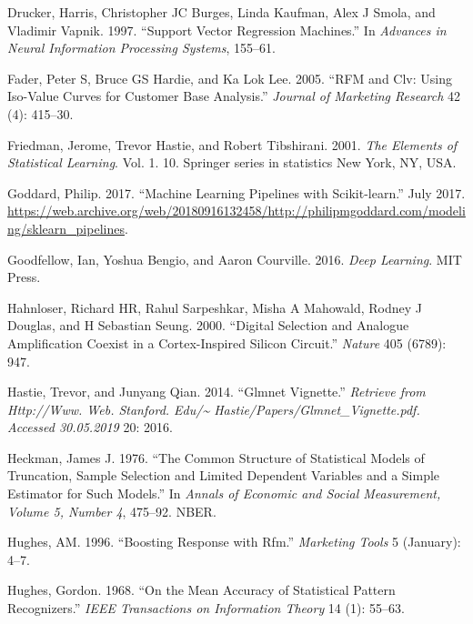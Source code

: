 \documentclass[
  11pt,
  a4paper,
  DIV=12,captions=tableheading,oneside,titlepage]{scrbook}
\begin{document}
\leavevmode\hypertarget{ref-drucker1997support}{}%
Drucker, Harris, Christopher JC Burges, Linda Kaufman, Alex J Smola, and Vladimir Vapnik. 1997. ``Support Vector Regression Machines.'' In \emph{Advances in Neural Information Processing Systems}, 155--61.

\leavevmode\hypertarget{ref-fader2005rfmclv}{}%
Fader, Peter S, Bruce GS Hardie, and Ka Lok Lee. 2005. ``RFM and Clv: Using Iso-Value Curves for Customer Base Analysis.'' \emph{Journal of Marketing Research} 42 (4): 415--30.

\leavevmode\hypertarget{ref-friedman2001elements}{}%
Friedman, Jerome, Trevor Hastie, and Robert Tibshirani. 2001. \emph{The Elements of Statistical Learning}. Vol. 1. 10. Springer series in statistics New York, NY, USA.

\leavevmode\hypertarget{ref-goddard2017variance}{}%
Goddard, Philip. 2017. ``Machine Learning Pipelines with Scikit-learn.'' July 2017. \url{https://web.archive.org/web/20180916132458/http://philipmgoddard.com/modeling/sklearn_pipelines}.

\leavevmode\hypertarget{ref-goodfellow2016deep}{}%
Goodfellow, Ian, Yoshua Bengio, and Aaron Courville. 2016. \emph{Deep Learning}. MIT Press.

\leavevmode\hypertarget{ref-hahnloser2000digital}{}%
Hahnloser, Richard HR, Rahul Sarpeshkar, Misha A Mahowald, Rodney J Douglas, and H Sebastian Seung. 2000. ``Digital Selection and Analogue Amplification Coexist in a Cortex-Inspired Silicon Circuit.'' \emph{Nature} 405 (6789): 947.

\leavevmode\hypertarget{ref-hastie2014glmnet}{}%
Hastie, Trevor, and Junyang Qian. 2014. ``Glmnet Vignette.'' \emph{Retrieve from Http://Www. Web. Stanford. Edu/\textasciitilde{} Hastie/Papers/Glmnet\_Vignette.pdf. Accessed 30.05.2019} 20: 2016.

\leavevmode\hypertarget{ref-heckman1976common}{}%
Heckman, James J. 1976. ``The Common Structure of Statistical Models of Truncation, Sample Selection and Limited Dependent Variables and a Simple Estimator for Such Models.'' In \emph{Annals of Economic and Social Measurement, Volume 5, Number 4}, 475--92. NBER.

\leavevmode\hypertarget{ref-hughes-rfm-boost-response}{}%
Hughes, AM. 1996. ``Boosting Response with Rfm.'' \emph{Marketing Tools} 5 (January): 4--7.

\leavevmode\hypertarget{ref-hughes1968mean}{}%
Hughes, Gordon. 1968. ``On the Mean Accuracy of Statistical Pattern Recognizers.'' \emph{IEEE Transactions on Information Theory} 14 (1): 55--63.
\end{document}
